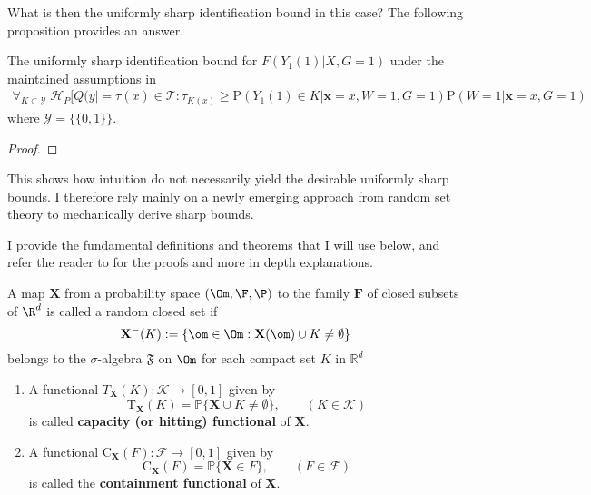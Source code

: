 \documentclass[uplatex,dvipdfmx]{jsarticle}
\begin{document}
What is then the uniformly sharp identification bound in this case? The following proposition provides an answer.
\begin{proposition}
    The uniformly sharp identification bound for $ F(Y_1(1) |  X, G=1)$ under the maintained assumptions in \cite{athey2020combining} 
    \begin{align*}
        \forall_{K\subset\mathcal{Y}}\;\mathcal{H}_P[ Q(y |   =  \tau(x) \in \mathcal{T} : \tau_{K(x)} \geq \mathrm{P}( Y_1(1) \in K | \mathbf{x}=x, W=1,G=1) \mathrm{P}(W =1 | \mathbf{x} = x, G=1)
    \end{align*}
    where $\mathcal{Y}= \{ \{0,1\} \}$.
\end{proposition}
\begin{proof}
    
\end{proof}


This shows how intuition do not necessarily yield the desirable uniformly sharp bounds. I therefore rely mainly on a newly emerging approach from random set theory \cite{molchanov2005theory} to mechanically derive sharp bounds.


I provide the fundamental definitions and theorems that I will use below, and refer the reader to \cite{molchanov2005theory,molchanov2018random} for the proofs and more in depth explanations.
\begin{definition}
    A map $\mathbf{X}$ from a probability space $( \Om,\F,\P ) $ to the family $\mathbf{F} $ of closed subsets of $ \R^d $ is called a random closed set if 
    \begin{equation}
        \mathbf{ X}^-(K) := \{ \om \in \Om : \mathbf{X} (\om) \cup K \neq \emptyset \}     
    \end{equation}
    belongs to the $\sigma $-algebra $\mathfrak{F} $ on $\Om$ for each compact set $K$ in $\mathbb{R}^d$
\end{definition}

\begin{definition}\mbox{}
    \begin{enumerate}[1.]
        \item A functional $T_\mathbf{X}( K) : \mathcal{K}  \to [0,1] $ given by 
        \begin{equation}
            \mathrm{T}_{\mathbf{X}}( K) = \mathbb{P} \{ \mathbf{X} \cup K \neq \emptyset \},\qquad (K \in \mathcal{K} )
        \end{equation}
        is called \textbf{capacity (or hitting) functional} of $\mathbf{X}$.
        \item A functional $\mathrm{C}_\mathbf{X}(F) : \mathcal{F} \to [0,1] $ given by
        \begin{equation}
            \mathrm{C}_\mathbf{X}(F) = \mathbb{P}\{ \mathbf{X} \in F\},\qquad (F \in \mathcal{F})
        \end{equation} 
        is called the \textbf{containment functional} of $\mathbf{X}$.
    \end{enumerate}
\end{definition}
\end{document}
